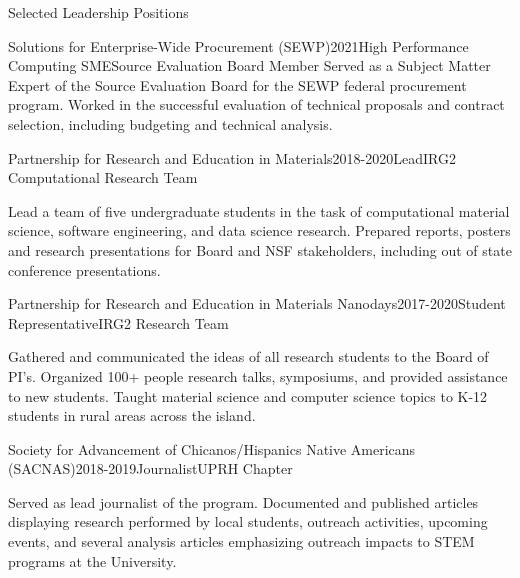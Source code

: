 \documentclass{resume} %
\begin{document}
\begin{rSection}{Selected Leadership Positions}

\begin{rSubsection}{Solutions for Enterprise-Wide Procurement (SEWP)}{2021}{High Performance Computing SME}{Source Evaluation Board Member}
Served as a Subject Matter Expert of the Source Evaluation Board for the SEWP federal procurement program. Worked in the successful evaluation of technical proposals and contract selection, including budgeting and technical analysis.
\end{rSubsection}

\begin{rSubsection}{Partnership for Research and Education in Materials}{2018-2020}{Lead}{IRG2 Computational Research Team}
\item Lead a team of five undergraduate students in the task of computational material science, software engineering, and data science research. Prepared reports, posters and research presentations for Board and NSF stakeholders, including out of state conference presentations. 
\end{rSubsection}

\begin{rSubsection}{Partnership for Research and Education in Materials Nanodays}{2017-2020}{Student Representative}{IRG2 Research Team}
\item Gathered and communicated the ideas of all research students to the Board of PI's. Organized 100+ people research talks, symposiums, and provided assistance to new students. Taught material science and computer science topics to K-12 students in rural areas across the island.
\end{rSubsection}

\begin{rSubsection}{Society for Advancement of Chicanos/Hispanics Native Americans (SACNAS)}{2018-2019}{Journalist}{UPRH Chapter}
\item Served as lead journalist of the program. Documented and published articles displaying research performed by local students, outreach activities, upcoming events, and several analysis articles emphasizing outreach impacts to STEM programs at the University. 
\end{rSubsection}

\end{rSection}
\end{document}
